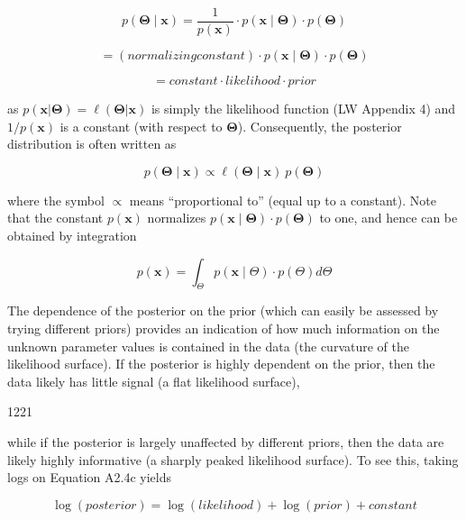 \documentclass{article}
\begin{document}
\begin{equation}
p(\boldsymbol{\Theta}\mid\mathbf{x})=\frac{1}{p(\mathbf{x})}\cdot p(\mathbf{x}\mid\boldsymbol{\Theta})\cdot p(\boldsymbol{\Theta})
\end{equation}

\begin{equation}
=(normalizing constant)\cdot p(\mathbf{x}\mid\boldsymbol{\Theta})\cdot p(\boldsymbol{\Theta})
\end{equation}

\begin{equation}
=constant\cdot likelihood\cdot prior
\end{equation}

as  $ p(\mathbf{x}|\boldsymbol{\Theta}) = \ell(\boldsymbol{\Theta}|\mathbf{x}) $ is simply the likelihood function (LW Appendix 4) and  $ 1/p(\mathbf{x}) $ is a constant (with respect to  $ \boldsymbol{\Theta} $). Consequently, the posterior distribution is often written as

\begin{equation}
p(\boldsymbol{\Theta}\mid\mathbf{x})\propto\ell(\boldsymbol{\Theta}\mid\mathbf{x})~p(\boldsymbol{\Theta})
\end{equation}

where the symbol  $ \propto $ means “proportional to” (equal up to a constant). Note that the constant  $ p(\mathbf{x}) $ normalizes  $ p(\mathbf{x} \mid \boldsymbol{\Theta}) \cdot p(\boldsymbol{\Theta}) $ to one, and hence can be obtained by integration

\begin{equation}
p(\mathbf{x})=\int_{\boldsymbol{\varTheta}}p(\mathbf{x}\mid\boldsymbol{\varTheta})\cdot p(\boldsymbol{\varTheta})d\boldsymbol{\varTheta}
\end{equation}

The dependence of the posterior on the prior (which can easily be assessed by trying different priors) provides an indication of how much information on the unknown parameter values is contained in the data (the curvature of the likelihood surface). If the posterior is highly dependent on the prior, then the data likely has little signal (a flat likelihood surface),

1221

while if the posterior is largely unaffected by different priors, then the data are likely highly informative (a sharply peaked likelihood surface). To see this, taking logs on Equation A2.4c yields

\begin{equation}
\log(posterior)=\log(likelihood)+\log(prior)+constant
\end{equation}
\end{document}
